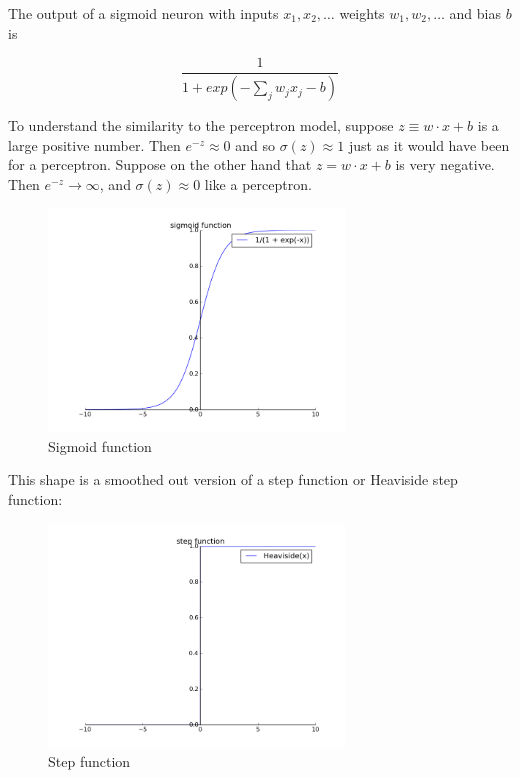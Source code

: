 \documentclass[12 pt]{article}
\begin{document}
The output of a sigmoid neuron with inputs $ x_1, x_2, \ldots{} $
weights $ w_1, w_2, \ldots{} $ and bias $ b $ is

\begin{equation}
    \frac {1}{1 + exp(−\sum_j w_j x_j − b)}
\end{equation}

To understand the similarity to the perceptron model, suppose $ z
\equiv w \cdot x + b $ is a large positive number. Then $ e ^ {−z}
\approx 0 $ and so $ \sigma(z) \approx 1 $ just as it would
have been for a perceptron. Suppose on the other hand that $ z = w
\cdot x + b $ is very negative. Then $ e ^{−z} \to \infty $,
and $ \sigma(z) \approx 0 $ like a perceptron.

\begin{figure}[htp]
\centering
\includegraphics[width=0.7\textwidth]{./figs/sigmoid_function.png}
\caption{Sigmoid function}
\end{figure}

This shape is a smoothed out version of a step function or Heaviside
step function:

\begin{figure}[htp]
\centering
\includegraphics[width=0.7\textwidth]{./figs/step_function.png}
\caption{Step function}
\end{figure}
\end{document}
